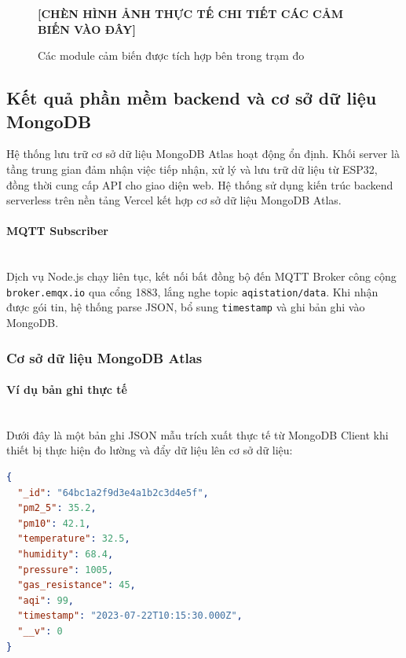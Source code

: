 \documentclass[12pt,a4paper]{article}
\begin{document}
\begin{figure}[H]
    \centering
    \textbf{[CHÈN HÌNH ẢNH THỰC TẾ CHI TIẾT CÁC CẢM BIẾN VÀO ĐÂY]}
    \caption{Các module cảm biến được tích hợp bên trong trạm đo}
    \label{fig:sensors_real}
\end{figure}

\subsection{Kết quả phần mềm backend và cơ sở dữ liệu MongoDB}
Hệ thống lưu trữ cơ sở dữ liệu MongoDB Atlas hoạt động ổn định. Khối server là tầng trung gian đảm nhận việc tiếp nhận, xử lý và lưu trữ dữ liệu từ ESP32, đồng thời cung cấp API cho giao diện web. Hệ thống sử dụng kiến trúc backend serverless trên nền tảng Vercel kết hợp cơ sở dữ liệu MongoDB Atlas.

\paragraph{MQTT Subscriber}\mbox{}\\
Dịch vụ Node.js chạy liên tục, kết nối bất đồng bộ đến MQTT Broker công cộng \texttt{broker.emqx.io} qua cổng 1883, lắng nghe topic \texttt{aqistation/data}. Khi nhận được gói tin, hệ thống parse JSON, bổ sung \texttt{timestamp} và ghi bản ghi vào MongoDB.

\subsubsection{Cơ sở dữ liệu MongoDB Atlas}
\paragraph{Ví dụ bản ghi thực tế}\mbox{}\\
Dưới đây là một bản ghi JSON mẫu trích xuất thực tế từ MongoDB Client khi thiết bị thực hiện đo lường và đẩy dữ liệu lên cơ sở dữ liệu:
\begin{lstlisting}[language=json, basicstyle=\footnotesize\ttfamily, backgroundcolor=\color{gray!10}, frame=single]
{
  "_id": "64bc1a2f9d3e4a1b2c3d4e5f",
  "pm2_5": 35.2,
  "pm10": 42.1,
  "temperature": 32.5,
  "humidity": 68.4,
  "pressure": 1005,
  "gas_resistance": 45,
  "aqi": 99,
  "timestamp": "2023-07-22T10:15:30.000Z",
  "__v": 0
}
\end{lstlisting}
\end{document}
